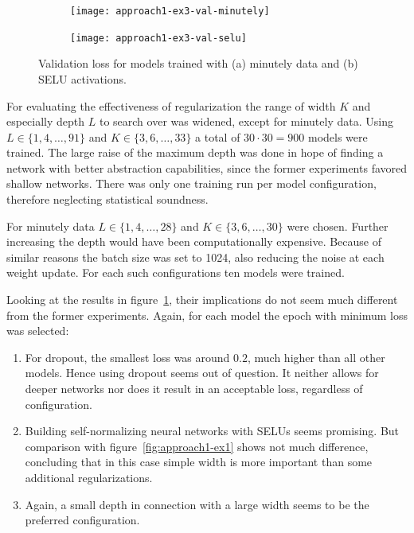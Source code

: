 \begin{figure}
	\centering
	\begin{subfigure}{0.49\linewidth}
		\texttt{[image: approach1-ex3-val-minutely]}
		\caption{}
	\end{subfigure}
	\begin{subfigure}{0.49\linewidth}
		\texttt{[image: approach1-ex3-val-selu]}
		\caption{}
	\end{subfigure}
	\caption[Validation loss for models trained with regularization techniques]{Validation loss for models trained with (a) minutely data and (b) SELU activations.}
	\label{fig:approach1-ex3}
\end{figure}

For evaluating the effectiveness of regularization the range of width $K$ and especially depth $L$ to search over was widened, except for minutely data. Using $L \in \{1,4,\dots,91\}$ and $K \in \{3,6,\dots,33\}$ a total of $30 \cdot 30 = 900$ models were trained. The large raise of the maximum depth was done in hope of finding a network with better abstraction capabilities, since the former experiments favored shallow networks. There was only one training run per model configuration, therefore neglecting statistical soundness. 

For minutely data $L \in \{1, 4, \dots, 28\}$ and $K \in \{3,6,\dots,30\}$ were chosen. Further increasing the depth would have been computationally expensive. Because of similar reasons the batch size was set to 1024, also reducing the noise at each weight update. For each such configurations ten models were trained.

Looking at the results in figure~\ref{fig:approach1-ex3}, their implications do not seem much different from the former experiments. Again, for each model the epoch with minimum loss was selected:

\begin{enumerate}
	\item For dropout, the smallest loss was around $0.2$, much higher than all other models. Hence using dropout seems out of question. It neither allows for deeper networks nor does it result in an acceptable loss, regardless of configuration.
	\item Building self-normalizing neural networks with SELUs seems promising. But comparison with figure~\ref{fig:approach1-ex1} shows not much difference, concluding that in this case simple width is more important than some additional regularizations.
	\item Again, a small depth in connection with a large width seems to be the preferred configuration. 
\end{enumerate}

